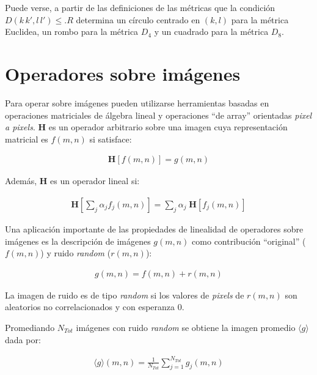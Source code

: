 %
Puede verse, a partir de las definiciones de las m\'etricas que la condici\'on $D(k \, k', l \, l') \leq. R$ determina un c\'irculo centrado en $(k, l)$
para la m\'etrica Euclidea, un rombo para la m\'etrica $D_{4}$ y un cuadrado para la m\'etrica $D_{8}$.


\section{Operadores sobre im\'agenes}

Para operar sobre im\'agenes pueden utilizarse herramientas basadas en operaciones matriciales de \'algebra lineal y operaciones ``de array'' orientadas
\textit{pixel a pixels}.
%
$\mathbf{H}$ es un operador arbitrario sobre una imagen cuya representaci\'on matricial es $f(m, n)$ si satisface:

\begin{eqnarray}
	\mathbf{H} \left[ f(m, n) \right] = g(m, n)
\label{EqXXXV}
\end{eqnarray}

Adem\'as, $\mathbf{H}$ es un operador lineal si:

\begin{eqnarray}
	\mathbf{H} \left[ \sum _{j} \alpha_{j} f_{j}(m, n) \right] = \sum _{j} \alpha_{j} \; \mathbf{H} \left[ f_{j}(m, n) \right]
\label{EqXXXVI}
\end{eqnarray}

Una aplicaci\'on importante de las propiedades de linealidad de operadores sobre im\'agenes es la descripci\'on de im\'agenes $g(m, n)$ como contribuci\'on
``original'' ($f(m, n)$) y ruido \textit{random} ($r(m, n)$):

\begin{eqnarray}
	g(m, n) = f(m, n) + r(m, n)
\label{EqXXXVII}
\end{eqnarray}


La imagen de ruido es de tipo \textit{random} si los valores de \textit{pixels} de $r(m, n)$ son aleatorios no correlacionados y con esperanza 0.
%

%
Promediando $N_{Tot}$ im\'agenes con ruido \textit{random} se obtiene la imagen promedio $\langle g \rangle$ dada por:

\begin{eqnarray}
	\langle g \rangle (m, n) = \frac{1}{N_{Tot}} \sum _{j=1} ^{N_{Tot}} g_{j} (m, n)
\label{EqXXXVIII}
\end{eqnarray}

